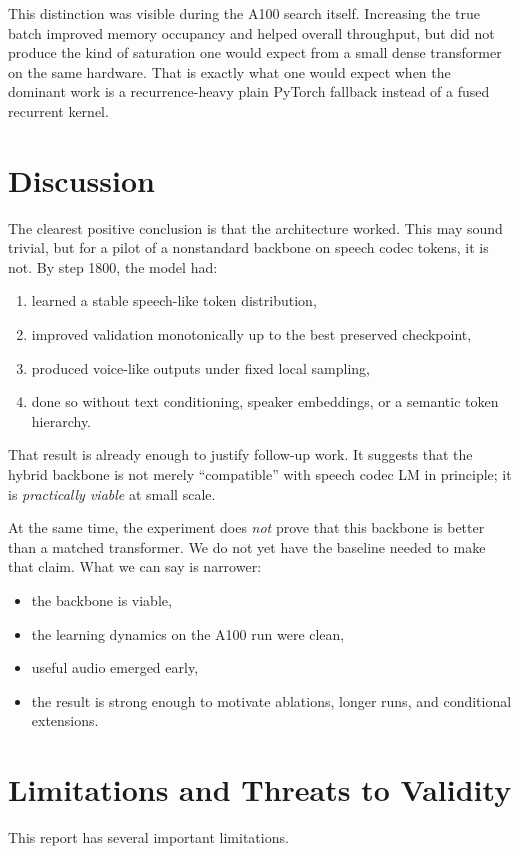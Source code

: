 \documentclass[11pt]{article}
\begin{document}
This distinction was visible during the A100 search itself. Increasing the true batch improved memory occupancy and helped overall throughput, but did not produce the kind of saturation one would expect from a small dense transformer on the same hardware. That is exactly what one would expect when the dominant work is a recurrence-heavy plain PyTorch fallback instead of a fused recurrent kernel.

\section{Discussion}
The clearest positive conclusion is that the architecture worked. This may sound trivial, but for a pilot of a nonstandard backbone on speech codec tokens, it is not. By step 1800, the model had:
\begin{enumerate}
    \item learned a stable speech-like token distribution,
    \item improved validation monotonically up to the best preserved checkpoint,
    \item produced voice-like outputs under fixed local sampling,
    \item done so without text conditioning, speaker embeddings, or a semantic token hierarchy.
\end{enumerate}

That result is already enough to justify follow-up work. It suggests that the hybrid backbone is not merely ``compatible'' with speech codec LM in principle; it is \emph{practically viable} at small scale.

At the same time, the experiment does \emph{not} prove that this backbone is better than a matched transformer. We do not yet have the baseline needed to make that claim. What we can say is narrower:
\begin{itemize}
    \item the backbone is viable,
    \item the learning dynamics on the A100 run were clean,
    \item useful audio emerged early,
    \item the result is strong enough to motivate ablations, longer runs, and conditional extensions.
\end{itemize}

\section{Limitations and Threats to Validity}
This report has several important limitations.
\end{document}
